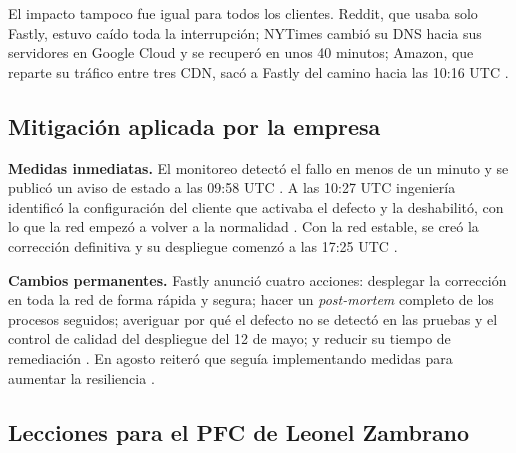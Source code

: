 El impacto tampoco fue igual para todos los clientes. Reddit, que usaba solo
Fastly, estuvo caído toda la interrupción; NYTimes cambió su DNS hacia sus
servidores en Google Cloud y se recuperó en unos 40 minutos; Amazon, que reparte
su tráfico entre tres CDN, sacó a Fastly del camino hacia las 10:16 UTC
\cite{medina2021thousandeyes}.

\subsection*{Mitigación aplicada por la empresa}

\textbf{Medidas inmediatas.} El monitoreo detectó el fallo en menos de un minuto
y se publicó un aviso de estado a las 09:58 UTC \cite{fastly2021,fastly2021q2}.
A las 10:27 UTC ingeniería identificó la configuración del cliente que activaba el
defecto \cite{fastly2021} y la deshabilitó, con lo que la red empezó a volver
a la normalidad \cite{fastly2021tweet}. Con la red estable, se creó la corrección
definitiva y su despliegue comenzó a las 17:25 UTC \cite{fastly2021}.

\textbf{Cambios permanentes.} Fastly anunció cuatro acciones: desplegar la
corrección en toda la red de forma rápida y segura; hacer un \textit{post-mortem}
completo de los procesos seguidos; averiguar por qué el defecto no se detectó en
las pruebas y el control de calidad del despliegue del 12 de mayo; y reducir su
tiempo de remediación \cite{fastly2021}. En agosto reiteró que seguía
implementando medidas para aumentar la resiliencia \cite{fastly2021q2}.

\subsection*{Lecciones para el PFC de Leonel Zambrano}

